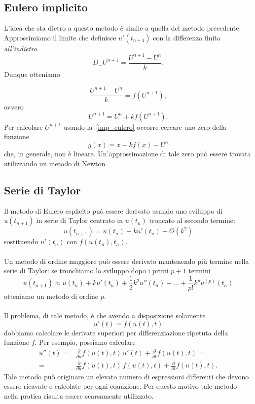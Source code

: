 \subsection{Eulero implicito }
L'idea che sta dietro a questo metodo \`e simile a quella del metodo precedente.\\
Approssimiamo il limite che definisce $u'\left(t_{n+1}\right)$ con la differenza finita \emph{all'indietro}
$$ D_{-}U^{n+1} = \frac{ U^{n+1}-U^n}{k}.$$ 
Dunque otteniamo 

$$ \frac{ U^{n+1}-U^n}{k} = f\left(U^{n+1}\right),$$ 
ovvero 
\begin{equation}
	 U^{n+1} = U^n + k f\left(U^{n+1}\right).
	 \label{imp_eulero}
\end{equation}
Per calcolare $U^{n+1}$ usando la~\eqref{imp_eulero} occorre cercare uno zero della funzione 
$$ g(x) = x - kf(x) - U^n$$ 
che, in generale, non \`e lineare. Un'approssimazione di tale  zero pu\`o essere trovata utilizzando un metodo di Newton.
\subsection{Serie di Taylor}
Il metodo di Eulero esplicito pu\`o essere derivato usando uno sviluppo di $u\left(t_{n+1}\right)$ in serie di Taylor  centrato in $u\left(t_n\right)$ troncato al secondo termine:
$$ u\left(t_{n+1}\right) = u(t_n) + k u'\left(t_n\right) + O\left(k^2\right)$$ 
sostituendo $u'\left(t_n\right)$ con $f\left(u\left(t_n\right),t_n\right)$.\\ \\
Un metodo di ordine maggiore pu\`o essere derivato mantenendo pi\`u termine nella serie di Taylor: se tronchiamo lo sviluppo dopo i primi $p+1$ termini
$$ u\left(t_{n+1}\right) \approx u\left(t_{n}\right) + ku'\left(t_{n}\right) + \frac{1}{2} k^2 u''\left(t_{n}\right) + \dots + \frac{1}{p!}k^p u^{(p)}\left(t_{n}\right)$$ 
otteniamo un metodo di ordine $p$.\\ \\

Il problema, di tale metodo, \`e che avendo a disposizione solamente
$$ u'(t) = f(u(t),t)$$
 dobbiamo calcolare le derivate superiori per differenziazione ripetuta della funzione $f$. Per esempio, possiamo calcolare 
\begin{equation*}
\label{der2}
	\begin{aligned}
	u''(t) =&\frac{\partial}{\partial u} f\left(u(t),t\right) \, u'(t) + 	\frac{\partial}{\partial t} f\left(u(t),t\right) =\\
	=& \frac{\partial}{\partial u} f\left(u(t),t\right) \, f\left(u(t),t\right) + \frac{\partial}{\partial t} f\left(u(t),t\right).\end{aligned}
\end{equation*}
Tale metodo pu\`o originare un elevato numero di espressioni differenti che devono essere ricavate e calcolate per ogni equazione. Per questo motivo tale metodo nella pratica risulta essere scarsamente utilizzato.
